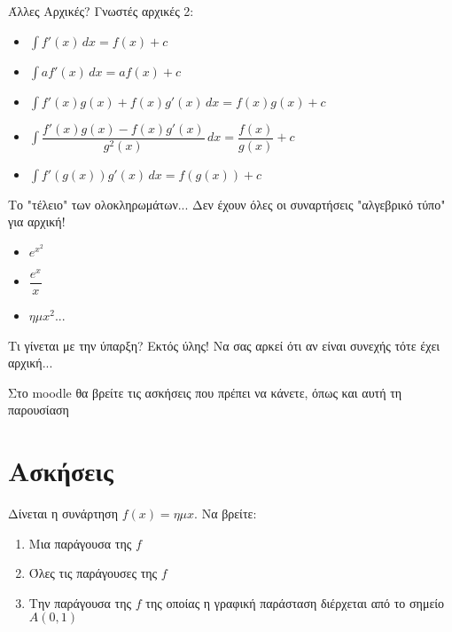\documentclass{../presentation}
\begin{document}
\begin{frame}{Άλλες Αρχικές?}
  Γνωστές αρχικές 2:
  \begin{itemize}[<+->]
    \item $\int f'(x) \, dx=f(x)+c$
    \item $\int af'(x) \, dx=af(x)+c$
    \item $\int f'(x)g(x)+f(x)g'(x) \, dx=f(x)g(x)+c$
    \item $\int \dfrac{f'(x)g(x)-f(x)g'(x)}{g^2(x)} \, dx=\dfrac{f(x)}{g(x)}+c$
    \item $\int f'(g(x))g'(x) \, dx=f(g(x))+c$
  \end{itemize}
\end{frame}

\begin{frame}{Το "τέλειο" των ολοκληρωμάτων...}
  Δεν έχουν όλες οι συναρτήσεις "αλγεβρικό τύπο" για αρχική!
  \begin{itemize}[<+->]
    \item $e^{x^2}$
    \item $\dfrac{e^x}{x}$
    \item $ημx^2$...
  \end{itemize}
\end{frame}

\begin{frame}{Τι γίνεται με την ύπαρξη?}
  Εκτός ύλης! Να σας αρκεί ότι αν είναι συνεχής τότε έχει αρχική...
  \newline
\end{frame}

\begin{frame}[noframenumbering]
  Στο moodle θα βρείτε τις ασκήσεις που πρέπει να κάνετε, όπως και αυτή τη παρουσίαση
\end{frame}

\section{Ασκήσεις}

\exercises

\begin{askisi}
  Δίνεται η συνάρτηση $f(x)=ημx$. Να βρείτε:
  \begin{enumerate}[<+->]
    \item Μια παράγουσα της $f$
    \item Όλες τις παράγουσες της $f$
    \item Την παράγουσα της $f$ της οποίας η γραφική παράσταση διέρχεται από το σημείο $A(0,1)$
  \end{enumerate}
\end{askisi}
\end{document}
